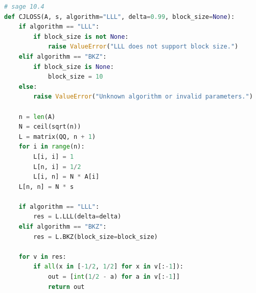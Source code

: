 \documentclass{book}
\numberwithin{equation}{subsubsection}
\begin{document}
\begin{lstlisting}[language=Python,basicstyle=\ttfamily,breaklines=true,keywordstyle=\bfseries\color{blue}]
# sage 10.4
def CJLOSS(A, s, algorithm="LLL", delta=0.99, block_size=None):
    if algorithm == "LLL":
        if block_size is not None:
            raise ValueError("LLL does not support block size.")
    elif algorithm == "BKZ":
        if block_size is None:
            block_size = 10
    else:
        raise ValueError("Unknown algorithm or invalid parameters.")
    
    n = len(A)
    N = ceil(sqrt(n))
    L = matrix(QQ, n + 1)
    for i in range(n):
        L[i, i] = 1
        L[n, i] = 1/2
        L[i, n] = N * A[i]
    L[n, n] = N * s

    if algorithm == "LLL":
        res = L.LLL(delta=delta)
    elif algorithm == "BKZ":
        res = L.BKZ(block_size=block_size)

    for v in res:
        if all(x in [-1/2, 1/2] for x in v[:-1]):
            out = [int(1/2 - a) for a in v[:-1]]
            return out
\end{lstlisting}
\end{document}
